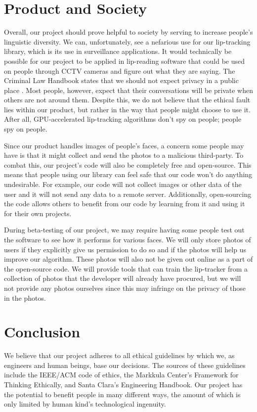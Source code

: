 \section{Product and Society}
Overall, our project should prove helpful to society by serving to increase people's linguistic diversity. We can, unfortunately, see a nefarious use for our lip-tracking library, which is its use in surveillance applications. It would technically be possible for our project to be applied in lip-reading software that could be used on people through CCTV cameras and figure out what they are saying. The Criminal Law Handbook states that we should not expect privacy in a public place \cite{criminal-law}. Most people, however, expect that their conversations will be private when others are not around them. Despite this, we do not believe that the ethical fault lies within our product, but rather in the way that people might choose to use it. After all, GPU-accelerated lip-tracking algorithms don't spy on people; people spy on people. 

Since our product handles images of people's faces, a concern some people may have is that it might collect and send the photos to a malicious third-party. To combat this, our project's code will also be completely free and open-source. This means that people using our library can feel safe that our code won't do anything undesirable. For example, our code will not collect images or other data of the user and it will not send any data to a remote server. Additionally, open-sourcing the code allows others to benefit from our code by learning from it and using it for their own projects. 

During beta-testing of our project, we may require having some people test out the software to see how it performs for various faces. We will only store photos of users if they explicitly give us permission to do so and if the photos will help us improve our algorithm. These photos will also not be given out online as a part of the open-source code. We will provide tools that can train the lip-tracker from a collection of photos that the developer will already have procured, but we will not provide any photos ourselves since this may infringe on the privacy of those in the photos.

\section{Conclusion} 
We believe that our project adheres to all ethical guidelines by which we, as engineers and human beings, base our decisions. The sources of these guidelines include the IEEE/ACM code of ethics, the Markkula Center's Framework for Thinking Ethically, and Santa Clara's Engineering Handbook. Our project has the potential to benefit people in many different ways, the amount of which is only limited by human kind's technological ingenuity.
